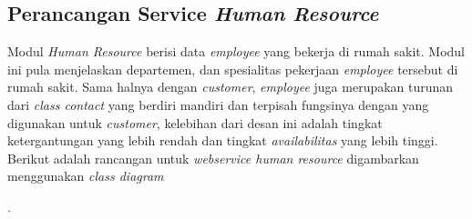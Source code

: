 \subsection{Perancangan Service \textit{Human Resource}}
Modul \textit{Human Resource} berisi data \textit{employee} yang bekerja di rumah sakit. Modul ini pula menjelaskan departemen, dan spesialitas pekerjaan \textit{employee} tersebut di rumah sakit. Sama halnya dengan \textit{customer}, \textit{employee} juga merupakan turunan dari \textit{class contact} yang berdiri mandiri dan terpisah fungsinya dengan yang digunakan untuk \textit{customer}, kelebihan dari desan ini adalah tingkat ketergantungan yang lebih rendah dan tingkat \textit{availabilitas} yang lebih tinggi.\\
Berikut adalah rancangan untuk \textit{webservice human resource} digambarkan menggunakan \textit{class diagram}

\begin{adjustbox}{width=1\textwidth}
	\begin{minipage}{\linewidth}
		.
	\end{minipage}
\end{adjustbox}

